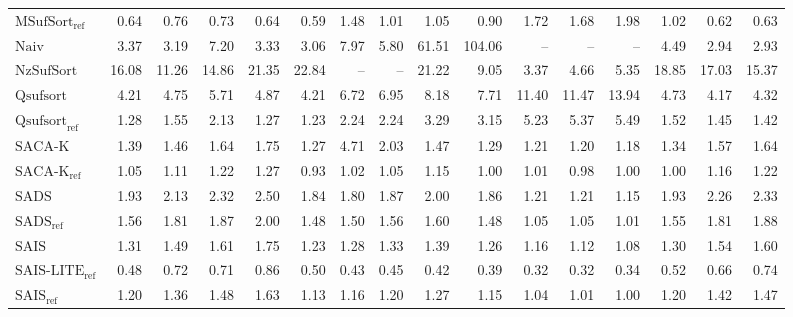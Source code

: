 \begin{table}
{\begin{tabular}{lrrrrrrrrrrrrrrr}
    $\text{MSufSort}_{\text{ref}}$ & 0.64 & 0.76 & 0.73 & 0.64 & 0.59 & 1.48 & 1.01 & 1.05 & 0.90 & 1.72 & 1.68 & 1.98 & 1.02 & 0.62 & 0.63 \\
    $\text{Naiv}$ & 3.37 & 3.19 & 7.20 & 3.33 & 3.06 & 7.97 & 5.80 & {\color{red}61.51} & {\color{red}104.06} & {\color{darkgray}--} & {\color{darkgray}--} & {\color{darkgray}--} & 4.49 & 2.94 & 2.93 \\
    $\text{NzSufSort}$ & {\color{red}16.08} & {\color{red}11.26} & {\color{red}14.86} & {\color{red}21.35} & {\color{red}22.84} & {\color{darkgray}--} & {\color{darkgray}--} & {\color{red}21.22} & 9.05 & 3.37 & 4.66 & 5.35 & {\color{red}18.85} & {\color{red}17.03} & {\color{red}15.37} \\
    $\text{Qsufsort}$ & 4.21 & 4.75 & 5.71 & 4.87 & 4.21 & 6.72 & 6.95 & 8.18 & 7.71 & 11.40 & {\color{red}11.47} & {\color{red}13.94} & 4.73 & 4.17 & 4.32 \\
    $\text{Qsufsort}_{\text{ref}}$ & 1.28 & 1.55 & 2.13 & 1.27 & 1.23 & 2.24 & 2.24 & 3.29 & 3.15 & 5.23 & 5.37 & 5.49 & 1.52 & 1.45 & 1.42 \\
    $\text{SACA-K}$ & 1.39 & 1.46 & 1.64 & 1.75 & 1.27 & 4.71 & 2.03 & 1.47 & 1.29 & 1.21 & 1.20 & 1.18 & 1.34 & 1.57 & 1.64 \\
    $\text{SACA-K}_{\text{ref}}$ & 1.05 & 1.11 & 1.22 & 1.27 & 0.93 & 1.02 & 1.05 & 1.15 & 1.00 & 1.01 & 0.98 & 1.00 & 1.00 & 1.16 & 1.22 \\
    $\text{SADS}$ & 1.93 & 2.13 & 2.32 & 2.50 & 1.84 & 1.80 & 1.87 & 2.00 & 1.86 & 1.21 & 1.21 & 1.15 & 1.93 & 2.26 & 2.33 \\
    $\text{SADS}_{\text{ref}}$ & 1.56 & 1.81 & 1.87 & 2.00 & 1.48 & 1.50 & 1.56 & 1.60 & 1.48 & 1.05 & 1.05 & 1.01 & 1.55 & 1.81 & 1.88 \\
    $\text{SAIS}$ & 1.31 & 1.49 & 1.61 & 1.75 & 1.23 & 1.28 & 1.33 & 1.39 & 1.26 & 1.16 & 1.12 & 1.08 & 1.30 & 1.54 & 1.60 \\
    $\text{SAIS-LITE}_{\text{ref}}$ & {\color{green!60!black}0.48} & 0.72 & 0.71 & 0.86 & 0.50 & {\color{green!60!black}0.43} & {\color{green!60!black}0.45} & {\color{green!60!black}0.42} & {\color{green!60!black}0.39} & {\color{green!60!black}0.32} & {\color{green!60!black}0.32} & {\color{green!60!black}0.34} & {\color{green!60!black}0.52} & 0.66 & 0.74 \\
    $\text{SAIS}_{\text{ref}}$ & 1.20 & 1.36 & 1.48 & 1.63 & 1.13 & 1.16 & 1.20 & 1.27 & 1.15 & 1.04 & 1.01 & 1.00 & 1.20 & 1.42 & 1.47 \\
\bottomrule
\end{tabular}
}
\end{table}

